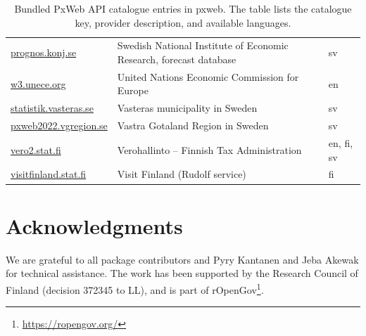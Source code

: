 \documentclass[11pt]{article}
\DeclareRobustCommand{\pkg}[1]{\textsf{#1}}
\begin{document}
\begin{table}[!htbp]
\begin{tabular}{@{}L{0.30\textwidth}L{0.46\textwidth}L{0.14\textwidth}@{}}
\url{prognos.konj.se} & Swedish National Institute of Economic Research, forecast database & sv\\
\url{w3.unece.org} & United Nations Economic Commission for Europe & en\\
\url{statistik.vasteras.se} & Vasteras municipality in Sweden & sv\\
\url{pxweb2022.vgregion.se} & Vastra Gotaland Region in Sweden & sv\\
\url{vero2.stat.fi} & Verohallinto -- Finnish Tax Administration & en, fi, sv\\
\url{visitfinland.stat.fi} & Visit Finland (Rudolf service) & fi\\
\hline
\end{tabular}
\caption{\label{tab:api-catalogue}Bundled PxWeb API catalogue entries in \pkg{pxweb}. The table lists the catalogue key, provider description, and available languages.}
\end{table}

\clearpage

\section*{Acknowledgments}

We are grateful to all package contributors and Pyry Kantanen and Jeba
Akewak for technical assistance. The work has been supported by the
Research Council of Finland (decision 372345 to LL), and is part of
rOpenGov\footnote{\url{https://ropengov.org/}}.




\end{document}
